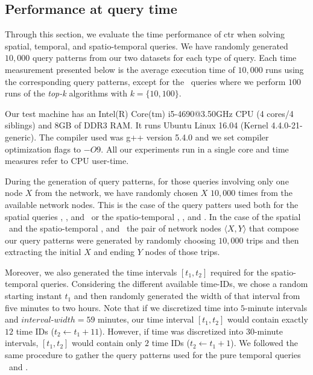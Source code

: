 



	\subsection{Performance at query time}
	Through this section, we evaluate the time performance of \gls{ctr} when solving spatial, temporal, and spatio-temporal queries.
	We have randomly generated $10,\!000$ query patterns from our two datasets for each type of query.
	Each time measurement presented below is the average execution time of $10,\!000$ runs using the corresponding query patterns, 
	except for the \Stk\ queries where we perform $100$ runs of the {\em top-k} algorithms with $k=\{10,100\}$.

	Our test machine has an Intel(R) Core(tm) i5-4690@3.50GHz CPU (4 cores/4 siblings) and 8GB of DDR3 RAM. 
	It runs Ubuntu Linux 16.04 (Kernel 4.4.0-21-generic). The compiler used was g++ version 5.4.0 and we set compiler optimization flags to $-O9$. All our experiments run in a single core and time measures refer to CPU user-time.

	During the generation of query patterns, for those queries involving only one node $X$ from the network, 
	we have randomly chosen $X$ $10,\!000$ times from the available network nodes. 
	This is the case of the query patters used both for
	the spatial queries \Sswx, \Sewx, and \Sux\ or the spatio-temporal \Tswx, \Tewx, and \Tux.
	In the case of the spatial \Sfxty\ and the spatio-temporal \Tfxtys, and \Tfxtyw\ the pair of
	network nodes $\langle X,Y \rangle$ that compose our
	query patterns were generated by randomly choosing
	$10,\!000$ trips and then extracting the initial $X$ and ending $Y$ nodes of those trips.

	Moreover, we also generated the time intervals $[t_1,t_2]$ required for 
	the spatio-temporal queries. Considering the different available time-IDs, we chose a random starting
	instant $t_1$ and then randomly generated the width of that interval from five minutes to two hours.
	Note that if we discretized time into $5$-minute intervals and $interval$-$width=59$ minutes, our time
	interval $[t_1,t_2]$ would contain exactly $12$ time IDs ($t_2\leftarrow t_1+11$). However, if time was
	discretized into $30$-minute intervals, $[t_1,t_2]$ would contain only $2$ time IDs ($t_2\leftarrow t_1+1$).
	We followed the same procedure to gather the query patterns used for the pure temporal queries \Tut\ and \Tst.


